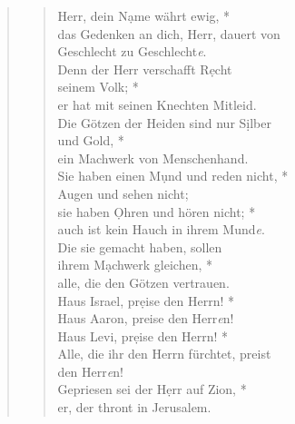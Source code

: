 \begin{quote}
\begin{verse}
Herr, dein N\d ame währt ewig, *\\ 
das Gedenken an dich, Herr, dauert von \\Geschlecht zu Geschlecht\textit{e}.\\  
\vin Denn der Herr verschafft R\d echt\\ \vin  seinem Volk; *\\ 
\vin er hat mit seinen Knechten Mitleid.\\ 
Die Götzen der Heiden sind nur S\d ilber\\ und Gold, *\\ 
ein Machwerk von Menschenhand.\\  
\vin Sie haben einen M\d und und reden nicht, *\\ 
\vin Augen und sehen nicht;\\ 
sie haben \d Ohren und hören nicht; *\\  
auch ist kein Hauch in ihrem Mund\textit{e}.\\ 
\vin Die sie gemacht haben, sollen \\ \vin ihrem M\d achwerk  gleichen, *\\ 
\vin alle, die den Götzen vertrauen.\\ 
Haus Israel, pr\d eise den Herrn! *\\ 
Haus Aaron, preise den Herr\textit{e}n! \\
\vin Haus Levi, pr\d eise den Herrn! *\\ 
\vin Alle, die ihr den Herrn fürchtet, preist\\ \vin  den Herr\textit{e}n!\\
Gepriesen sei der H\d err auf Zion, *\\ 
er, der thront in Jerusalem.\\  



\end{verse}
\end{quote}


